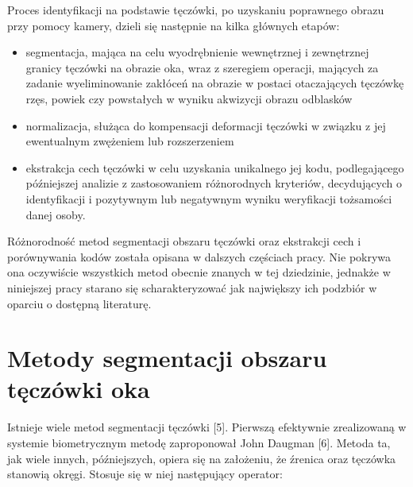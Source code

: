 	Proces identyfikacji na podstawie tęczówki, po uzyskaniu poprawnego obrazu przy pomocy kamery, dzieli się następnie na kilka głównych etapów: \begin{itemize}
\item segmentacja, mająca na celu wyodrębnienie wewnętrznej i zewnętrznej granicy tęczówki na obrazie oka, wraz z szeregiem operacji, mających za zadanie wyeliminowanie zakłóceń na obrazie w postaci otaczających tęczówkę rzęs, powiek czy powstałych w wyniku akwizycji obrazu odblasków
\item normalizacja, służąca do kompensacji deformacji tęczówki w związku z jej ewentualnym zwężeniem lub rozszerzeniem 
\item ekstrakcja cech tęczówki w celu uzyskania unikalnego jej kodu, podlegającego późniejszej analizie z zastosowaniem różnorodnych kryteriów, decydujących o identyfikacji i pozytywnym lub negatywnym wyniku weryfikacji tożsamości danej osoby.
\end{itemize}
	Różnorodność metod segmentacji obszaru tęczówki oraz ekstrakcji cech i porównywania kodów została opisana w dalszych częściach pracy. Nie pokrywa ona oczywiście wszystkich metod obecnie znanych w tej dziedzinie, jednakże w niniejszej pracy starano się scharakteryzować jak największy ich podzbiór w oparciu o dostępną literaturę.


\section{Metody segmentacji obszaru tęczówki oka}
\label{sec:segmentacja}

Istnieje wiele metod segmentacji tęczówki [5]. Pierwszą efektywnie zrealizowaną w systemie biometrycznym metodę zaproponował John Daugman [6]. Metoda ta, jak wiele innych, późniejszych, opiera się na założeniu, że źrenica oraz tęczówka stanowią okręgi. Stosuje się w niej następujący operator:

